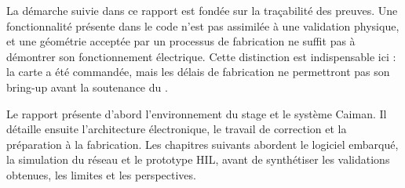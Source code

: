 La démarche suivie dans ce rapport est fondée sur la traçabilité des preuves. Une fonctionnalité présente dans le code n'est pas assimilée à une validation physique, et une géométrie acceptée par un processus de fabrication ne suffit pas à démontrer son fonctionnement électrique. Cette distinction est indispensable ici : la carte a été commandée, mais les délais de fabrication ne permettront pas son bring-up avant la soutenance du \DefenseDate.

Le rapport présente d'abord l'environnement du stage et le système Caiman. Il détaille ensuite l'architecture électronique, le travail de correction et la préparation à la fabrication. Les chapitres suivants abordent le logiciel embarqué, la simulation du réseau et le prototype HIL, avant de synthétiser les validations obtenues, les limites et les perspectives.
